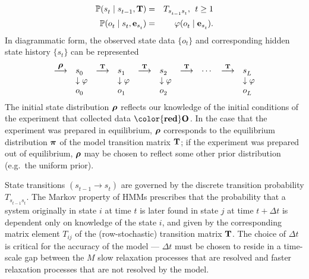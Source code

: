 \documentclass[aps,pre,twocolumn,superscriptaddress,nofootinbib,longbibliography]{revtex4-1}
\newcommand{\bfv}[1]{{\mbox{\boldmath{$#1$}}}}
\newcommand{\bfm}[1]{{\bf #1}}
\begin{document}
{\begin{eqnarray}
\mathbb{P}(s^{}_t \mid s^{}_{t-1}, \bfm{T}) &=& T_{s^{}_{t-1} s^{}_{t}} , \:\: t \ge 1 \nonumber \\
\mathbb{P}(o^{}_t \mid s^{}_t, \bfm{e}_{s^{}_{t}}) &=& \varphi(o^{}_{t} \mid \bfm{e}_{s^{}_{t}}) \label{equation:hmm-process} .
\end{eqnarray}
In diagrammatic form, the observed state data $\{o_t\}$ and corresponding hidden state history $\{s_t\}$ can be represented 
\begin{eqnarray}
\begin{array}{llllllllll}
 \stackrel{\bfv{\rho}}{\longrightarrow} & s^{}_{0} & \stackrel{\bfm{T}}{\longrightarrow} & s^{}_{1} & \stackrel{\bfm{T}}{\longrightarrow} & s^{}_{2} & \stackrel{\bfm{T}}{\longrightarrow} & \cdots & \stackrel{\bfm{T}}{\longrightarrow} & s^{}_{L^{}} \\
 & \downarrow \varphi &  & \downarrow \varphi & & \downarrow \varphi & & & & \downarrow \varphi \\
 & o^{}_{0} & & o^{}_{1} & & o^{}_{2} &  & & & o^{}_{L^{}} \\
\end{array}
\end{eqnarray} 
The initial state distribution $\bfv{\rho}^{}$  reflects our knowledge of the initial conditions of the experiment that collected data $\bfm{{\color{red} O}}^{}$.
In the case that the experiment was prepared in equilibrium, $\bfv{\rho}$ corresponds to the equilibrium distribution $\bfv{\pi}$ of the model transition matrix $\bfm{T}$; if the experiment was prepared out of equilibrium, $\bfv{\rho}$ may be chosen to reflect some other prior distribution (e.g.~the uniform prior).

State transitions $(s^{}_{t-1} \rightarrow s^{}_{t})$ are governed by the discrete transition probability $T_{s^{}_{t-1} s^{}_{t}}$.
The Markov property of HMMs prescribes that the probability that a system originally in state $i$ at time $t$ is later found in state $j$ at time $t+\Delta t$ is dependent only on knowledge of the state $i$, and given by the corresponding matrix element $T_{ij}$ of the (row-stochastic) transition matrix $\bfm{T}$.
{\color{magenta}The choice of $\Delta t$ is critical for the accuracy of the model \cite{NoeEtAl_PMMHMM_JCP13} --- $\Delta t$ must
be chosen to reside in a time-scale gap between the $M$ slow relaxation processes that are resolved and faster relaxation
processes that are not resolved by the model.}

}
\end{document}
